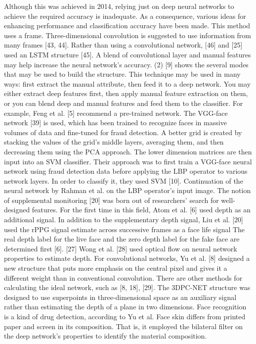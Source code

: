 \documentclass[journal]{IEEEtran}
\begin{document}
Although this was achieved in 2014, relying just on deep neural networks to achieve the required accuracy is inadequate. As a consequence, various ideas for enhancing performance and classification accuracy have been made.
This method uses a frame. Three-dimensional convolution is suggested to use information from many frames [43, 44]. Rather than using a convolutional network, [46] and [25] used an LSTM structure [45].
A blend of convolutional layer and manual features may help increase the neural network's accuracy. (2) [9] shows the several modes that may be used to build the structure. This technique may be used in many ways: first extract the manual attribute, then feed it to a deep network. You may either extract deep features first, then apply manual feature extraction on them, or you can blend deep and manual features and feed them to the classifier.
For example, Feng et al. [5] recommend a pre-trained network. The VGG-face network [39] is used, which has been trained to recognize faces in massive volumes of data and fine-tuned for fraud detection. A better grid is created by stacking the values of the grid's middle layers, averaging them, and then decreasing them using the PCA approach. The lower dimension matrices are then input into an SVM classifier.
Their approach was to first train a VGG-face neural network using fraud detection data before applying the LBP operator to various network layers. In order to classify it, they used SVM [10].
Continuation of the neural network by Rahman et al. on the LBP operator's input image. The notion of supplemental monitoring [20] was born out of researchers' search for well-designed features.
For the first time in this field, Atom et al. [6] used depth as an additional signal.
In addition to the supplementary depth signal, Liu et al. [20] used the rPPG signal estimate across successive frames as a face life signal The real depth label for the live face and the zero depth label for the fake face are determined first [6].
[27] Wong et al. [28] used optical flow on neural network properties to estimate depth.
For convolutional networks, Yu et al. [8] designed a new structure that puts more emphasis on the central pixel and gives it a different weight than in conventional convolution. There are other methods for calculating the ideal network, such as [8, 18], [29].
The 3DPC-NET structure was designed to use superpoints in three-dimensional space as an auxiliary signal rather than estimating the depth of a plane in two dimensions.
Face recognition is a kind of drug detection, according to Yu et al. Face skin differs from printed paper and screen in its composition. That is, it employed the bilateral filter on the deep network's properties to identify the material composition.
\end{document}
